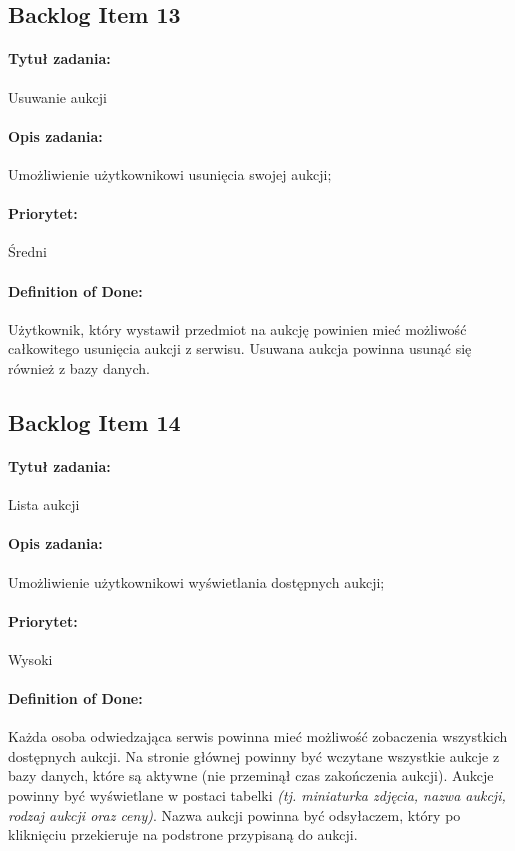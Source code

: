 \documentclass[a4paper]{article}
\begin{document}
	\subsection{Backlog Item 13}
	\paragraph{Tytuł zadania:} Usuwanie aukcji
	\paragraph{Opis zadania:} Umożliwienie użytkownikowi usunięcia swojej aukcji;
	\paragraph{Priorytet:} Średni
	\paragraph{Definition of Done:} Użytkownik, który wystawił przedmiot na aukcję powinien mieć możliwość całkowitego usunięcia aukcji z serwisu. Usuwana aukcja powinna usunąć się również z bazy danych.
	
	\subsection{Backlog Item 14}
	\paragraph{Tytuł zadania:} Lista aukcji
	\paragraph{Opis zadania:} Umożliwienie użytkownikowi wyświetlania dostępnych aukcji;
	\paragraph{Priorytet:} Wysoki
	\paragraph{Definition of Done:} Każda osoba odwiedzająca serwis powinna mieć możliwość zobaczenia wszystkich dostępnych aukcji. Na stronie głównej powinny być wczytane wszystkie aukcje z bazy danych, które są aktywne (nie przeminął czas zakończenia aukcji). Aukcje powinny być wyświetlane w postaci tabelki \emph{(tj. miniaturka zdjęcia, nazwa aukcji, rodzaj aukcji oraz ceny)}. Nazwa aukcji powinna być odsyłaczem, który po kliknięciu przekieruje na podstrone przypisaną do aukcji.
	
\end{document}
